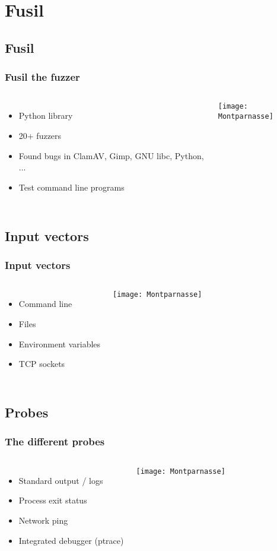 \section{Fusil}

\subsection{Fusil}
\frame
{
    \frametitle{Fusil the fuzzer}
    \begin{columns}[c]
        \column{2.7in}
          \begin{itemize}
          \item Python library
          \item 20+ fuzzers
          \item Found bugs in ClamAV, Gimp, GNU libc, Python, ...
          \item Test command line programs
          \end{itemize}

        \column{2in}
            \texttt{[image: Montparnasse]}
    \end{columns}
}

\subsection{Input vectors}
\frame
{
    \frametitle{Input vectors}
    \begin{columns}[c]
        \column{2.7in}
          \begin{itemize}
          \item Command line
          \item Files
          \item Environment variables
          \item TCP sockets
          \end{itemize}

        \column{2in}
            \texttt{[image: Montparnasse]}
    \end{columns}
}

\subsection{Probes}
\frame
{
    \frametitle{The different probes}
    \begin{columns}[c]
        \column{2.7in}
            \begin{itemize}
            \item Standard output / logs
            \item Process exit status
            \item Network ping
            \item Integrated debugger (ptrace)
            \end{itemize}

        \column{2in}
            \texttt{[image: Montparnasse]}
    \end{columns}
}


